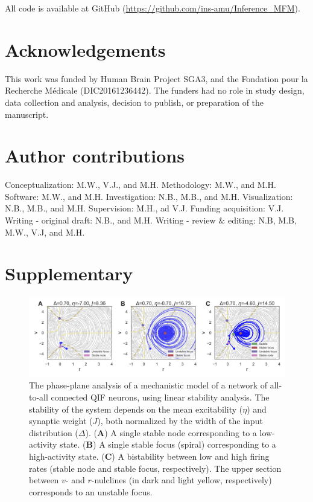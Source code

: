 \documentclass[preprint,11pt,authoryear]{elsarticle}
\begin{document}
All code is available at GitHub (\url{https://github.com/ins-amu/Inference_MFM}).


\section*{Acknowledgements}

This work was funded by Human Brain Project SGA3, and the Fondation pour la Recherche M\'edicale (DIC20161236442). The funders had no role in study design, data collection and analysis, decision to publish, or preparation of the manuscript. 


\section*{Author contributions}

Conceptualization: M.W., V.J., and M.H. Methodology: M.W., and M.H.  Software: M.W., and M.H.  Investigation: N.B.,  M.B., and M.H. Visualization: N.B.,  M.B., and M.H. Supervision:  M.H., ad V.J. Funding acquisition: V.J. Writing - original draft: N.B., and M.H. Writing - review $\&$ editing: N.B, M.B,  M.W., V.J, and M.H.





\clearpage   

\setcounter{figure}{0}

\section{Supplementary}


\begin{figure}[ht]
    \centering
    \includegraphics[width=\linewidth]{Figs/FigS1.png}
    \renewcommand{\thefigure}{S\arabic{figure}}
    \caption{The phase-plane analysis of a mechanistic model of a network of all-to-all connected QIF neurons, using linear stability analysis. The stability of the system depends on the mean excitability ($\eta$) and synaptic weight ($J$), both normalized by the width of the input distribution ($\Delta$). (\textbf{A}) A single stable node corresponding to a low-activity state. (\textbf{B}) A single stable focus (spiral) corresponding to a high-activity state. (\textbf{C}) A bistability between low and high firing rates (stable node and stable focus, respectively). The upper section between $v$- and $r$-nulclines (in dark and light yellow, respectively) corresponds to an unstable focus. }
    \label{fig:MPR_Istep_phaseplanes}
\end{figure}
\end{document}
